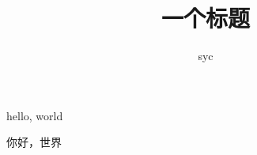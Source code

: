 \documentclass[a4paper, 12pt, fontset=windows]{ctexbook}
\title{一个标题}
\author{syc}
\begin{document}
\maketitle
\newpage

hello, world

你好，世界
\end{document}
